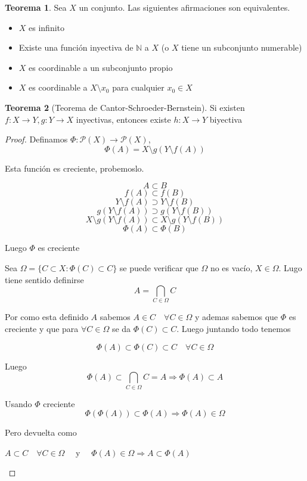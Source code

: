 \documentclass[12pt]{article}
\newcommand{\N}{\mathbb{N}}
\newcommand{\Ra}{\Rightarrow}
\newcommand{\ra}{\rightarrow}
\theoremstyle{definition}
\newtheorem{theorem}{Teorema}
\begin{document}
\begin{theorem}
  Sea $X$ un conjunto. Las siguientes afirmaciones son equivalentes.
  \begin{itemize}
    \item $X$ es infinito
    \item Existe una función inyectiva de $\N$ a $X$ (o $X$ tiene un subconjunto numerable)
    \item $X$ es coordinable a un subconjunto propio
    \item $X$ es coordinable a $X \setminus {x_{0}}$ para cualquier $x_{0} \in X$
  \end{itemize}
\end{theorem}


\begin{theorem}[Teorema de Cantor-Schroeder-Bernstein]
  Si existen $f: X \ra Y, g:Y \ra X$ inyectivas, entonces existe $h:X \ra Y$ biyectiva
  \begin{proof}
    Definamos $\Phi: \mathcal{P}(X) \ra \mathcal{P}(X)$,
    $$\Phi (A) = X \setminus g(Y \setminus f(A)) $$

   Esta función es creciente, probemoslo.

   $$ A \subset B $$ 
   $$ f(A) \subset f(B)$$
   $$ Y \setminus f(A) \supset Y \setminus f(B)$$
   $$ g(Y \setminus f(A)) \supset g(Y \setminus f(B))$$
   $$ X \setminus g(Y \setminus f(A)) \subset X \setminus g(Y \setminus f(B)) $$ 
   $$ \Phi (A) \subset \Phi (B)$$
 
Luego $\Phi$ es creciente

Sea $\Omega = \{C \subset X : \Phi (C) \subset C \} $ se puede verificar que $\Omega$ no es vacío, $X \in \Omega$. Lugo tiene sentido definirse
$$ A = \bigcap_{C \in \Omega} C$$

Por como esta definido $A$ sabemos $A \in C \quad \forall C \in \Omega$ y ademas sabemos que $\Phi$ es creciente y que para $\forall C \in \Omega$ se da  $\Phi(C) \subset C$. Luego juntando todo tenemos

$$ \Phi (A) \subset \Phi (C) \subset C \quad \forall C \in \Omega$$

Luego $$ \Phi (A) \subset \bigcap_{C \in \Omega} C = A \Ra \Phi (A) \subset A$$

Usando $\Phi$ creciente $$ \Phi (\Phi (A)) \subset \Phi (A) \Ra \Phi (A) \in \Omega$$

Pero devuelta como 
\begin{center} $A \subset C \quad \forall C \in \Omega \quad $ y $\quad \Phi (A) \in \Omega \Ra A \subset \Phi (A) $ \end{center}
  

\end{proof}
\end{theorem}
\end{document}

